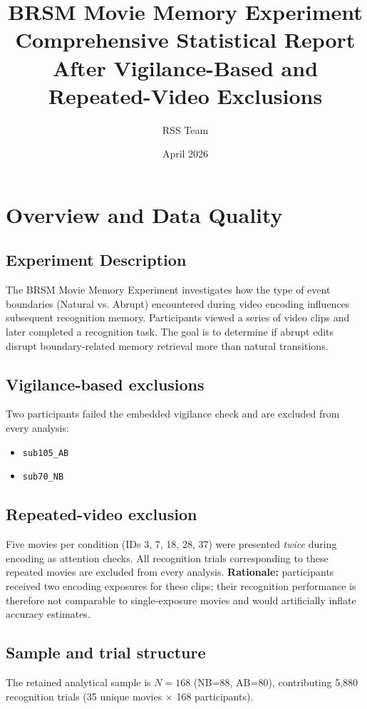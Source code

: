 \documentclass[12pt,a4paper]{article}
\title{\textbf{BRSM Movie Memory Experiment}\\
\large Comprehensive Statistical Report\\
\normalsize After Vigilance-Based and Repeated-Video Exclusions}
\author{RSS Team}
\date{April 2026}
\begin{document}
\maketitle
\tableofcontents
\newpage


\section{Overview and Data Quality}

\subsection{Experiment Description}
The BRSM Movie Memory Experiment investigates how the type of event boundaries (Natural vs. Abrupt) encountered during video encoding influences subsequent recognition memory. Participants viewed a series of video clips and later completed a recognition task. The goal is to determine if abrupt edits disrupt boundary-related memory retrieval more than natural transitions.

\subsection{Vigilance-based exclusions}
Two participants failed the embedded vigilance check and are excluded from every analysis:
\begin{itemize}[nosep]
  \item \texttt{sub105\_AB}
  \item \texttt{sub70\_NB}
\end{itemize}

\subsection{Repeated-video exclusion}
Five movies per condition (IDs 3, 7, 18, 28, 37) were presented \emph{twice} during
encoding as attention checks. All recognition trials corresponding to these repeated movies
are excluded from every analysis. \textbf{Rationale:} participants received two encoding
exposures for these clips; their recognition performance is therefore not comparable to
single-exposure movies and would artificially inflate accuracy estimates.


\subsection{Sample and trial structure}
The retained analytical sample is $N=168$ (NB=88, AB=80),
contributing 5,880 recognition trials (35 unique movies $\times$ 168 participants).
\end{document}
